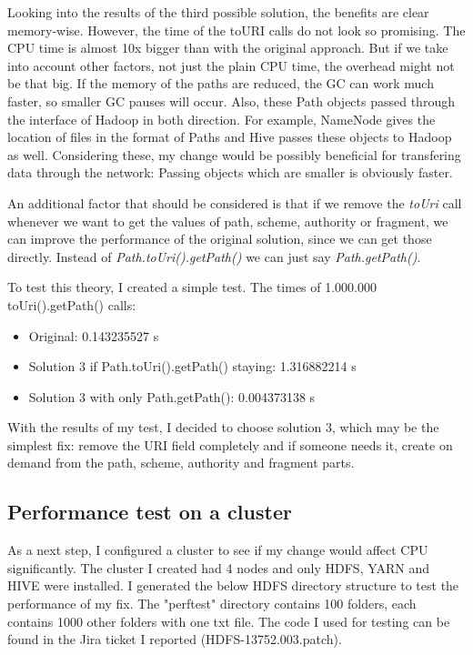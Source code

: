 Looking into the results of the third possible solution, the benefits are clear memory-wise. However, the time of the toURI calls do not look so promising. The CPU time is almost 10x bigger than with the original approach. But if we take into account other factors, not just the plain CPU time, the overhead might not be that big. If the memory of the paths are reduced, the GC can work much faster, so smaller GC pauses will occur. Also, these Path objects passed through the interface of Hadoop in both direction. For example, NameNode gives the location of files in the format of Paths and Hive passes these objects to Hadoop as well. Considering these, my change would be possibly beneficial for transfering data through the network: Passing objects which are smaller is obviously faster. 

An additional factor that should be considered is that if we remove the \textit{toUri} call whenever we want to get the values of path, scheme, authority or fragment, we can improve the performance of the original solution, since we can get those directly. Instead of \textit{Path.toUri().getPath() } we can just say \textit{Path.getPath()}.

To test this theory, I created a simple test. The times of 1.000.000 toUri().getPath() calls:
\begin{itemize}
	\item Original: 0.143235527 s
	\item Solution 3 if Path.toUri().getPath() staying: 1.316882214 s
	\item Solution 3 with only Path.getPath(): 0.004373138 s
\end{itemize}

With the results of my test, I decided to choose solution 3, which may be the simplest fix: remove the URI field completely and if someone needs it, create on demand from the path, scheme, authority and fragment parts.

\subsection{Performance test on a cluster}
As a next step, I configured a cluster to see if my change would affect CPU significantly. The cluster I created had 4 nodes and only HDFS, YARN and HIVE were installed. I generated the below HDFS directory structure to test the performance of my fix. The "perftest" directory contains 100 folders, each contains 1000 other folders with one txt file. The code I used for testing can be found in the Jira ticket I reported \cite{hdfs-path} (HDFS-13752.003.patch).

